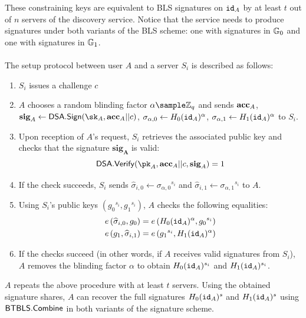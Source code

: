 		\noindent These constraining keys are equivalent to BLS signatures on $\mathtt{id}_A$ by at least $t$ out of $n$ servers of the discovery service. Notice that the service needs to produce signatures under both variants of the BLS scheme: one with signatures in $\mathbb{G}_0$ and one with signatures in $\mathbb{G}_1$.
		
		
		\paragraph{} The setup protocol between user $A$ and a server $S_i$ is described as follows:
		\begin{enumerate}
			\item $S_i$ issues a challenge $c$
			\item $A$ chooses a random blinding factor $\alpha \sample \mathbb{Z}_q$ and sends $\mathbf{acc}_A$, $\mathbf{sig}_A \leftarrow \SIG.\Sign(\sk_A, \acc_A || c)$, $\sigma_{\alpha,0} \leftarrow H_0(\mathtt{id}_A)^\alpha$, $\sigma_{\alpha,1} \leftarrow H_1(\mathtt{id}_A)^\alpha$ to $S_i$.
			\item Upon reception of $A$'s request, $S_i$ retrieves the associated public key and checks that the signature $\mathbf{sig_A}$ is valid:
			\begin{equation}
				\SIG.\Verif(\pk_A, \acc_A||c, \mathbf{sig}_A) = 1
			\end{equation}
		\item If the check succeeds, $S_i$ sends $\widehat\sigma_{i,0} \leftarrow {\sigma_{\alpha,0}}^{s_i}$ and $\widehat\sigma_{i,1} \leftarrow {\sigma_{\alpha,1}}^{s_i}$ to $A$.
		\item Using $S_i$'s public keys $({g_0}^{s_i}, {g_1}^{s_i})$, $A$ checks the following equalities:
		\begin{align}
			\label{eq:usercheck0}
			e\left(\widehat\sigma_{i,0}, g_0 \right) &= e\left(H_0(\mathtt{id}_A)^\alpha, {g_0}^{s_i} \right) \\
			\label{eq:usercheck1}
			e\left(g_1, \widehat\sigma_{i,1} \right) &= e\left({g_1}^{s_i}, H_1(\mathtt{id}_A)^\alpha \right)
		\end{align}
		\item If the checks succeed (in other words, if $A$ receives valid signatures from $S_i$), $A$ removes the blinding factor $\alpha$ to obtain $H_0(\mathtt{id}_A)^{s_i}$ and $H_1(\mathtt{id}_A)^{s_i}$.
		\end{enumerate}
		
	
	\noindent $A$ repeats the above procedure with at least $t$ servers. Using the obtained signature shares, $A$ can recover the full signatures $H_0(\mathtt{id}_A)^s$ and $H_1(\mathtt{id}_A)^s$ using $\mathsf{BTBLS}.\mathsf{Combine}$ in both variants of the signature scheme.
	
